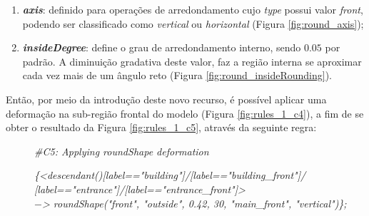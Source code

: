 \begin{enumerate}
    \item \label{itm:axis} \textbf{\textit{axis}}: definido para operações de arredondamento cujo \textit{type} possui valor \textit{front}, podendo ser classificado como \textit{vertical} ou \textit{horizontal} (Figura \ref{fig:round_axis});
    
    \item \label{itm:insideRounding} \textbf{\textit{insideDegree}}: define o grau de arredondamento interno, sendo $0.05$ por padrão. A diminuição gradativa deste valor, faz a região interna se aproximar cada vez mais de um ângulo reto (Figura \ref{fig:round_insideRounding}).
\end{enumerate}

\vspace{0.3cm}

Então, por meio da introdução deste novo recurso, é possível aplicar uma deformação na sub-região frontal do modelo (Figura \ref{fig:rules_1_c4}), a fim de se obter o resultado da Figura \ref{fig:rules_1_c5}, através da seguinte regra:

\vspace{0.3cm}

\begin{description}
    \item[] \qquad \textit{\#C5: Applying roundShape deformation}
    \item[] \qquad \textit{\{<descendant()[label=="building"]/[label=="building\_front"]/} \\
    \textit{[label=="entrance"]/[label=="entrance\_front"]>} \\
    \textit{$-$> roundShape("front", "outside", 0.42, 30, "main\_front", "vertical")\};}
\end{description}

\vspace{0.3cm}

\begin{figure}[h!]
	\centering
	\captionsetup{width=15cm}
	{}	
\end{figure}

